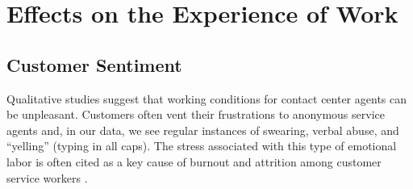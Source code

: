 \documentclass[11pt]{article}
\begin{document}
\section{Effects on the Experience of Work}



\subsection{Customer Sentiment}

Qualitative studies suggest that working conditions for contact center agents can be unpleasant.  Customers often vent their frustrations to anonymous service agents and, in our data, we see regular instances of swearing, verbal abuse, and ``yelling'' (typing in all caps).  The stress associated with this type of emotional labor is often cited as a key cause of burnout and attrition among customer service workers \citep{leePhilippinesHasBecome2015}.  

\end{document}

